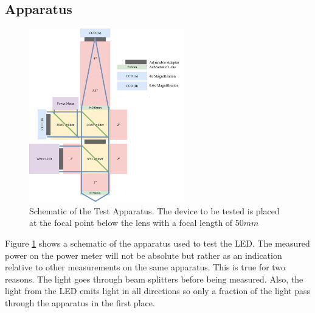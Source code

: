\subsection{Apparatus}
\label{sec:test:apparatus}

\begin{figure}
  \centering
  \includegraphics[width=0.6\textwidth]{Figures/angus_bruce/apparatus_microandnano1.pdf}
  \caption{Schematic of the Test Apparatus. The device to be tested is placed at the focal point below the lens with a focal length of $50mm$}
  \label{fig:apparatus}
\end{figure}

Figure \ref{fig:apparatus} shows a schematic of the apparatus used to test the LED. The measured power on the power meter will not be absolute but rather as an indication relative to other measurements on the same apparatus. This is true for two reasons. The light goes through beam splitters before being measured. Also, the light from the LED emits light in all directions so only a fraction of the light pass through the apparatus in the first place.
